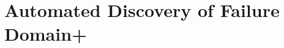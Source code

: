 \documentclass[runningheads,a4paper]{llncs}
\begin{document}
\section{Automated Discovery of Failure Domain+}\label{sec:adfd+}




\end{document}
